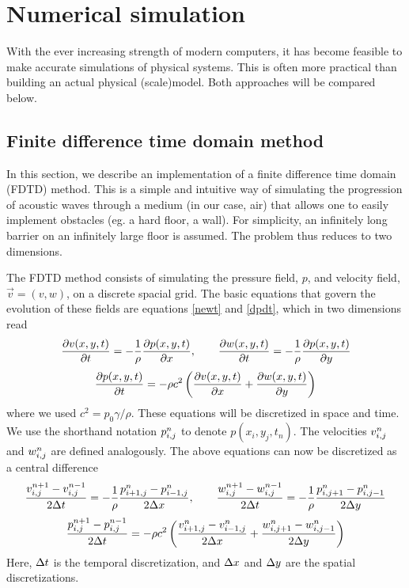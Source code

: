 \section{Numerical simulation \label{sectSimulation}}
With the ever increasing strength of modern computers, it has become feasible to make accurate simulations of physical systems. This is often more practical than building an actual physical (scale)model. Both approaches will be compared below.


\subsection{Finite difference time domain method}
In this section, we describe an implementation of a finite difference time domain (FDTD) method. This is a simple and intuitive way of simulating the progression of acoustic waves through a medium (in our case, air) that allows one to easily implement obstacles (eg. a hard floor, a wall). For simplicity, an infinitely long barrier on an infinitely large floor is assumed. The problem thus reduces to two dimensions.

The FDTD method consists of simulating the pressure field, $p$, and velocity field, $\vec{v} = (v, w)$,  on a discrete spacial grid. The basic equations that govern the evolution of these fields are equations \ref{newt} and \ref{dpdt}, which in two dimensions read
$$
\frac{\partial v(x,y,t)}{\partial t} = -\frac{1}{\rho} \frac{\partial p(x,y,t)}{\partial x}
, \qquad
\frac{\partial w(x,y,t)}{\partial t} = -\frac{1}{\rho} \frac{\partial p(x,y,t)}{\partial y}
$$
$$
\frac{\partial p(x,y,t)}{\partial t} = -\rho c^2 \left(\frac{\partial v(x,y,t)}{\partial x} + \frac{\partial w(x,y,t)}{\partial y}\right)
$$
where we used $c^2 = p_0 \gamma / \rho$. These equations will be discretized in space and time. We use the shorthand notation $p_{i,j}^n$ to denote $p(x_i, y_j, t_n)$. The velocities $v_{i,j}^n$ and $w_{i,j}^n$ are defined analogously. The above equations can now be discretized as a central difference
$$
\frac{v_{i,j}^{n+1} - v_{i,j}^{n-1}}{2\Delta t} = -\frac{1}{\rho} \frac{p^n_{i+1,j} - p^n_{i-1,j}}{2\Delta x}
, \qquad
\frac{w_{i,j}^{n+1} - w_{i,j}^{n-1}}{2\Delta t} = -\frac{1}{\rho} \frac{p^n_{i,j+1} - p^n_{i,j-1}}{2\Delta y}
$$
$$
\frac{p_{i,j}^{n+1} - p_{i,j}^{n-1}}{2\Delta t} = 
	-\rho c^2 \left(
		\frac{v^n_{i+1,j} - v^n_{i-1,j}}{2\Delta x}
		+ \frac{w^n_{i,j+1} - w^n_{i,j-1}}{2\Delta y}
	\right)
$$
Here, $\Delta t$ is the temporal discretization, and $\Delta x$ and $\Delta y$ are the spatial discretizations.

